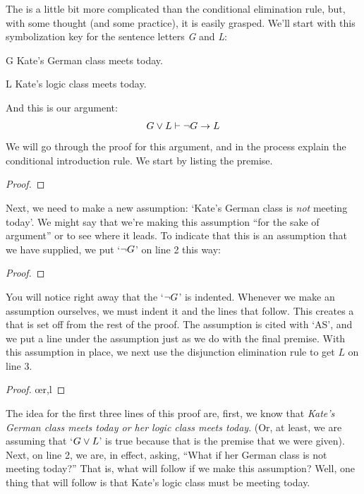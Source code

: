 The  is a little bit more complicated than the conditional elimination rule, but, with some thought (and some practice), it is easily grasped. We'll start with this symbolization key for the sentence letters \textit{G} and \textit{L}:
	\begin{ekey}
		\item[G] Kate's German class meets today.
		\item[L] Kate's logic class meets today.
	\end{ekey}
And this is our argument: 
$$G \vee L \vdash {\neg} G \rightarrow L$$
We will go through the proof for this argument, and in the process explain the conditional introduction rule. We start by listing the premise.
	\begin{proof}
		 \pr{}
	\end{proof}
Next, we need to make a new assumption: `Kate's German class is \textit{not} meeting today'. We might say that we're making this assumption ``for the sake of argument'' or to see where it leads. To indicate that this is an assumption that we have supplied, we put `${\neg} G$' on line 2 this way:
	\begin{proof}
		 \pr{}
		\open
			 \as{}
	\end{proof}
You will notice right away that the `${\neg} G$' is indented. Whenever we make an assumption ourselves, we must indent it and the lines that follow. This creates a  that is set off from the rest of the proof. The assumption is cited with `AS', and we put a line under the assumption just as we do with the final premise.
With this assumption in place, we next use the disjunction elimination rule to get $L$ on line 3.
	\begin{proof}
		 \pr{}
		\open
			 \as{}
			\oe{r,l}
	\end{proof}

The idea for the first three lines of this proof are, first, we know that \textit{Kate's German class meets today or her logic class meets today}. (Or, at least, we are assuming that `$ G \vee L$' is true because that is the premise that we were given). Next, on line 2, we are, in effect, asking, ``What if her German class is not meeting today?'' That is, what will follow if we make this assumption? Well, one thing that will follow is that Kate's logic class must be meeting today.  

